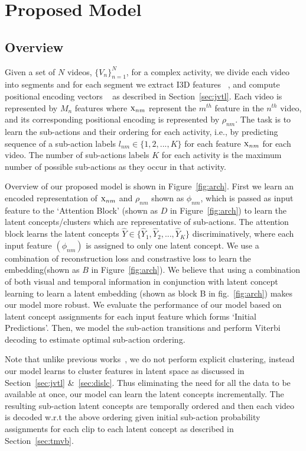 \documentclass[final]{cvpr}
\begin{document}
\section{Proposed Model}
\subsection{Overview}
\label{sec:overview}
\par Given a set of $N$ videos, $\{V_{n}\}_{n=1}^{N}$, for a complex activity, we divide each video into segments and for each segment we extract I3D features~\cite{rl-a-carreira2017quo} , and compute positional encoding vectors ~\cite{vaswani2017attention} as described in Section~\ref{sec:jvtl}. Each video 
is represented by $M_{n}$ features where $\textsc{x}_{nm}$ represent the $m^{th}$ feature in the $n^{th}$ video, and its corresponding positional encoding is represented by $\rho_{nm}$. The task is to learn the sub-actions and their ordering for each activity, i.e., by predicting sequence of a sub-action labels $l_{nm} \in \{1,2,...,K\}$ for each feature $\textsc{x}_{nm}$ for each video. The number of sub-actions labels $K$ for each activity is the maximum number of possible sub-actions as they occur in that activity. 


\par Overview of our proposed model is shown in Figure~\ref{fig:arch}. First we learn an encoded representation of $\textsc{x}_{nm}$ and $\rho_{nm}$ shown as $\phi_{nm}$,
which is passed as input feature to the `Attention Block' (shown as $D$ in Figure~\ref{fig:arch}) to learn the latent concepts/clusters which are representative of sub-actions.
The attention block learns the latent concepts $\widehat{Y} \in \{\widehat{Y}_1, \widehat{Y}_2,..., \widehat{Y}_K\}$ discriminatively, where each input feature $(\phi_{nm})$ is assigned to only one latent concept.
We use a combination of reconstruction loss and constrastive loss to learn the embedding(shown as $B$ in Figure~\ref{fig:arch}). 
We believe that using a combination of both visual and temporal information in conjunction with latent concept learning to learn a latent embedding (shown as block B in fig.~\ref{fig:arch}) makes our model more robust.
We evaluate the performance of our model based on latent concept assignments for each input feature which forms `Initial Predictions'. 
Then, we model the sub-action transitions and perform Viterbi decoding to estimate optimal sub-action ordering.

\par Note that unlike previous works~\cite{kukleva2019unsupervised}, we do not perform explicit clustering, instead our model learns to cluster features in latent space as discussed in Section~\ref{sec:jvtl} \&~\ref{sec:dislc}. 
Thus eliminating the need for all the data to be available at once, our model can learn the latent concepts incrementally. The resulting sub-action latent concepts are temporally ordered and then each video is decoded w.r.t the above ordering given initial sub-action probability assignments for each clip to each latent concept as described in Section~\ref{sec:tmvb}.
\end{document}

